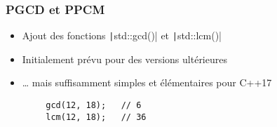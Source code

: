 \documentclass[C++.tex]{subfiles}
\begin{document}
\begin{frame}[fragile]
	\frametitle{PGCD et PPCM}
	\begin{itemize}
		\item Ajout des fonctions \texttt|std::gcd()| et \texttt|std::lcm()|
		\item Initialement prévu pour des versions ultérieures
		\item \ldots{} mais suffisamment simples et élémentaires pour C++17
	\end{itemize}

	\begin{verbatim}
		gcd(12, 18);   // 6
		lcm(12, 18);   // 36
	\end{verbatim}


\end{frame}
\end{document}
